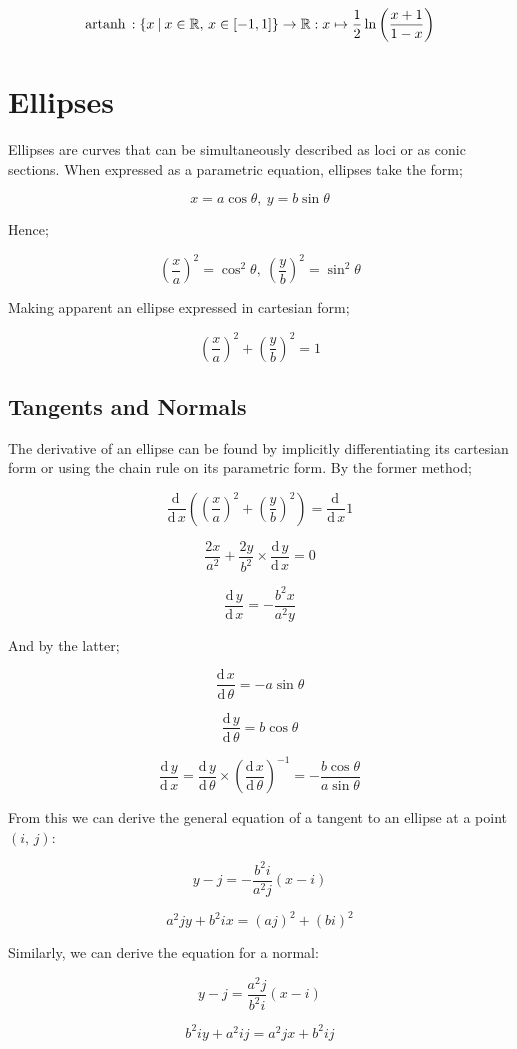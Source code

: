 \documentclass{article}
\newcommand{\de}{\textrm{d}\,}
\newcommand{\st}{\:|\:}
\newcommand{\artanh}{\textrm{artanh\,}}
\begin{document}
\[\artanh : \left\{x \st x \in \mathbb{R},\, x \in \left[-1, 1\right]\right\}
\rightarrow \mathbb{R} : x \mapsto \frac{1}{2}\ln\left(\frac{x + 1}{1 -
x}\right)\]

\section{Ellipses}

Ellipses are curves that can be simultaneously described as loci or as conic
sections. When expressed as a parametric equation, ellipses take the form;

\[x = a\cos\theta,\: y = b\sin\theta\]

\noindent Hence;

\[\left(\frac{x}{a}\right)^2 = \cos^2\theta,\: \left(\frac{y}{b}\right)^2 =
\sin^2\theta\]

\noindent Making apparent an ellipse expressed in cartesian form;

\[\left(\frac{x}{a}\right)^2 + \left(\frac{y}{b}\right)^2 = 1\]

\subsection{Tangents and Normals}

The derivative of an ellipse can be found by implicitly differentiating its
cartesian form or using the chain rule on its parametric form. By the former
method;

\[\frac{\de}{\de x} \left(\left(\frac{x}{a}\right)^2 +
\left(\frac{y}{b}\right)^2\right) = \frac{\de}{\de x}1\]

\[\frac{2x}{a^2} + \frac{2y}{b^2} \times \frac{\de y}{\de x} = 0\]

\[\frac{\de y}{\de x} = -\frac{b^2x}{a^2y}\]

\noindent And by the latter;

\[\frac{\de x}{\de \theta} = -a\sin\theta\]

\[\frac{\de y}{\de \theta} = b\cos\theta\]

\[\frac{\de y}{\de x} = \frac{\de y}{\de \theta} \times \left(\frac{\de x}{\de
\theta}\right)^{-1} = -\frac{b\cos\theta}{a\sin\theta}\]

\noindent From this we can derive the general equation of a tangent to an
ellipse at a point $\left(i,\, j\right)$:

\[y - j = -\frac{b^2i}{a^2j}\left(x - i\right)\]

\[a^2jy + b^2ix = \left(aj\right)^2 + \left(bi\right)^2\]

\noindent Similarly, we can derive the equation for a normal:

\[y - j = \frac{a^2j}{b^2i}\left(x - i\right)\]

\[b^2iy + a^2ij = a^2jx + b^2ij\]
\end{document}
